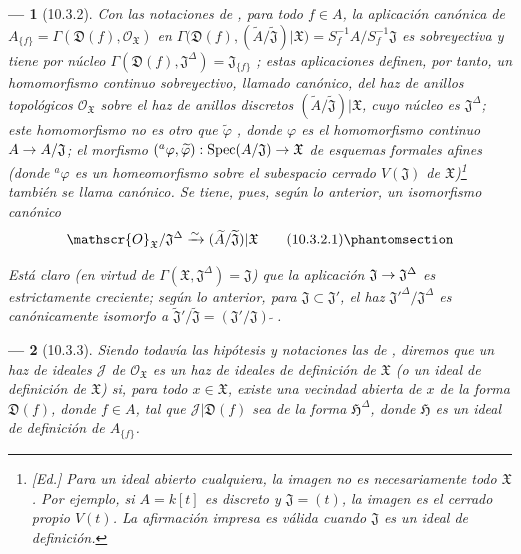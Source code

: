 \documentclass[oneside]{amsart}
\theoremstyle{ega-env-style}
\newtheorem*{env}{---}
\theoremstyle{ega-thm-env-style}
\theoremstyle{ega-defn-env-style}
\def\supertilde{{\,\widetilde{\,}\,}}   %
\renewcommand{\to}{\mathchoice{\longrightarrow}{\rightarrow}{\rightarrow}{\rightarrow}}
\newcommand{\oldpage}[2][]{{\marginnote{\normalfont{\textbf{#1}~|~#2}}}\ignorespaces}
\let\EGAOriginalLabel\label
\renewcommand{\label}[1]{\phantomsection\EGAOriginalLabel{#1}}
\begin{document}
\oldpage[I]{184}
\begin{env}[10.3.2]
\label{I.10.3.2}
Con las notaciones de , para todo $f\in A$, la aplicación canónica de $A_{\{f\}}=\Gamma(\mathfrak{D}(f),\mathscr{O}_{\mathfrak{X}})$ en $\Gamma\bigl(\mathfrak{D}(f),
(\widetilde{A}/\widetilde{\mathfrak{J}})|\mathfrak{X}\bigr)
=S_f^{-1}A/S_f^{-1}\mathfrak{J}$ es \emph{sobreyectiva} y tiene por núcleo $\Gamma(\mathfrak{D}(f),\mathfrak{J}^\Delta)=\mathfrak{J}_{\{f\}}$ ; estas aplicaciones definen, por tanto, un homomorfismo continuo \emph{sobreyectivo}, llamado \emph{canónico}, del haz de anillos topológicos $\mathscr{O}_{\mathfrak{X}}$ sobre el haz de anillos discretos $(\widetilde{A}/\widetilde{\mathfrak{J}})|\mathfrak{X}$, cuyo núcleo es $\mathfrak{J}^\Delta$; este homomorfismo no es otro que $\widetilde{\varphi}$ , donde $\varphi$ es el homomorfismo continuo $A\to A/\mathfrak{J}$; el morfismo $({}^a\varphi,\widetilde{\varphi}):
\operatorname{Spec}(A/\mathfrak{J})\to\mathfrak{X}$ de esquemas formales afines (donde ${}^a\varphi$ es un homeomorfismo sobre el subespacio cerrado $V(\mathfrak{J})$ de $\mathfrak{X}$)\footnote{\emph{[Ed.] Para un ideal abierto cualquiera, la imagen no es necesariamente todo $\mathfrak{X}$. Por ejemplo, si $A=k[t]$ es discreto y $\mathfrak{J}=(t)$, la imagen es el cerrado propio $V(t)$. La afirmación impresa es válida cuando $\mathfrak{J}$ es un ideal de definición.}} también se llama \emph{canónico}.
Se tiene, pues, según lo anterior, un \emph{isomorfismo canónico}
\[
  \mathscr{O}_{\mathfrak{X}}/\mathfrak{J}^\Delta
  \xrightarrow{\sim}
  (\widetilde{A}/\widetilde{\mathfrak{J}})|\mathfrak{X}
  \tag{10.3.2.1}\label{I.10.3.2.1-fr}
\]

Está claro (en virtud de $\Gamma(\mathfrak{X},\mathfrak{J}^\Delta)=\mathfrak{J}$) que la aplicación $\mathfrak{J}\to\mathfrak{J}^\Delta$ es \emph{estrictamente creciente}; según lo anterior, para $\mathfrak{J}\subset\mathfrak{J}'$, el haz ${\mathfrak{J}'}^\Delta/\mathfrak{J}^\Delta$ es canónicamente isomorfo a $\widetilde{\mathfrak{J}}'/\widetilde{\mathfrak{J}}
=(\mathfrak{J}'/\mathfrak{J})\supertilde$.
\end{env}

\begin{env}[10.3.3]
\label{I.10.3.3}
Siendo todavía las hipótesis y notaciones las de , diremos que un haz de ideales $\mathscr{J}$ de $\mathscr{O}_{\mathfrak{X}}$ es un \emph{haz de ideales de definición} de $\mathfrak{X}$ (o un \emph{ideal de definición} de $\mathfrak{X}$) si, para todo $x\in\mathfrak{X}$, existe una vecindad abierta de $x$ de la forma $\mathfrak{D}(f)$, donde $f\in A$, tal que $\mathscr{J}|\mathfrak{D}(f)$ sea de la forma $\mathfrak{H}^\Delta$, donde $\mathfrak{H}$ es un ideal de definición de $A_{\{f\}}$.
\end{env}
\end{document}
